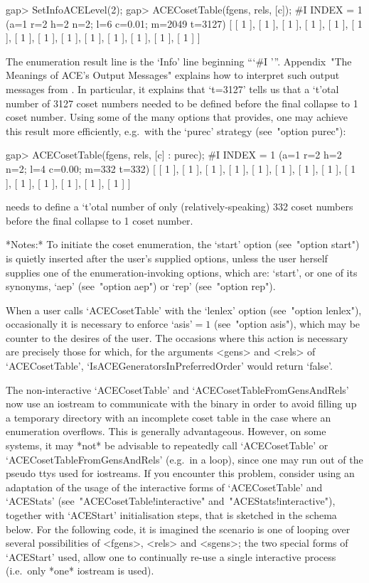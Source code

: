 \beginexample
gap> SetInfoACELevel(2);
gap> ACECosetTable(fgens, rels, [c]);
#I  INDEX = 1 (a=1 r=2 h=2 n=2; l=6 c=0.01; m=2049 t=3127)
[ [ 1 ], [ 1 ], [ 1 ], [ 1 ], [ 1 ], [ 1 ], [ 1 ], [ 1 ], [ 1 ], [ 1 ], 
  [ 1 ], [ 1 ], [ 1 ], [ 1 ] ]
\endexample

The enumeration result line is the `Info' line  beginning  ```\#I '''.
Appendix~"The Meanings of  ACE's  Output  Messages"  explains  how  to
interpret such output messages from {\ACE}. In particular, it explains
that `t=3127' tells us that a `t'otal number  of  3127  coset  numbers
needed to be defined before the final  collapse  to  1  coset  number.
Using some of the many options that {\ACE} provides, one  may  achieve
this  result  more  efficiently,  e.g.~with   the   `purec'   strategy
(see~"option purec"):

\beginexample
gap> ACECosetTable(fgens, rels, [c] : purec);
#I  INDEX = 1 (a=1 r=2 h=2 n=2; l=4 c=0.00; m=332 t=332)
[ [ 1 ], [ 1 ], [ 1 ], [ 1 ], [ 1 ], [ 1 ], [ 1 ], [ 1 ], [ 1 ], [ 1 ], 
  [ 1 ], [ 1 ], [ 1 ], [ 1 ] ]
\endexample

{\ACE} needs to define a `t'otal number of only  (relatively-speaking)
332 coset numbers before the final collapse to 1 coset number.

*Notes:* 
To initiate the coset enumeration,  the  `start'  option  (see~"option
start") is quietly inserted after the user's supplied options,  unless
the user herself supplies one  of  the  enumeration-invoking  options,
which are: `start', or one of its synonyms, `aep'  (see~"option  aep")
or `rep' (see~"option rep").

When  a  user  calls  `ACECosetTable'   with   the   `lenlex'   option
(see~"option  lenlex"),  occasionally  it  is  necessary  to   enforce
`asis'${}=1$ (see~"option asis"), which may be counter to the  desires
of the  user.  The  occasions  where  this  action  is  necessary  are
precisely those for which, for the  arguments  <gens>  and  <rels>  of
`ACECosetTable',   `IsACEGeneratorsInPreferredOrder'   would    return
`false'.

The non-interactive `ACECosetTable' and `ACECosetTableFromGensAndRels'
now use an iostream to communicate with the {\ACE} binary in order  to
avoid filling up a temporary directory with an incomplete coset  table
in  the  case  where  an  enumeration  overflows.  This  is  generally
advantageous. However, on some systems, it may *not* be  advisable  to
repeatedly  call  `ACECosetTable'  or   `ACECosetTableFromGensAndRels'
(e.g.~in a loop), since one may run out of the pseudo  ttys  used  for
iostreams. If you encounter this problem, consider using an adaptation
of  the  usage  of  the  interactive  forms  of  `ACECosetTable'   and
`ACEStats'                            (see~"ACECosetTable!interactive"
and~"ACEStats!interactive"), together with  `ACEStart'  initialisation
steps, that is sketched in the schema below. For the  following  code,
it  is  imagined  the  scenario  is  one  of  looping   over   several
possibilities of <fgens>, <rels> and <sgens>; the two special forms of
`ACEStart' used, allow one to continually re-use a single  interactive
{\ACE} process (i.e.~only *one* iostream is used).

